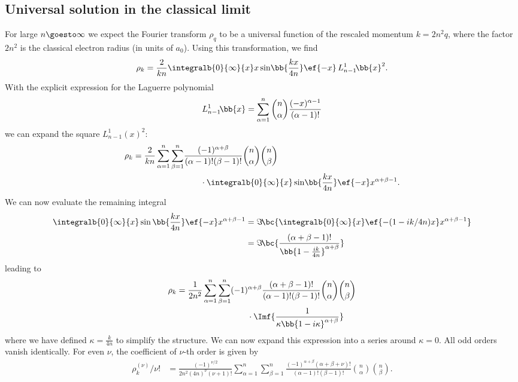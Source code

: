 \subsection{Universal solution in the classical limit}
For large $n \goesto \infty$ we expect the Fourier transform $\rho_q$ to be a universal function of the rescaled momentum $k=2n^2 q$, where the factor $2n^2$ is the classical electron radius (in units of $a_0$). Using this transformation, we find
\begin{align}
\rho_k = \frac{2}{k n}\integralb{0}{\infty}{x} x \sin\!\bb{\frac{kx}{4n}} \ef{-x} \, L_{n-1}^1\!\bb{x}^2.
\end{align}
With the explicit expression for the Laguerre polynomial
\begin{align}
L_{n-1}^1\!\bb{x}=\sum_{\alpha=1}^{n} \binom{n}{\alpha} \frac{(-x)^{\alpha-1}}{(\alpha-1)!}
\end{align}
we can expand the square $L^1_{n-1}(x)^2$:
\begin{align}
    \rho_k=\frac{2}{k n} \sum_{\alpha=1}^{n}\sum_{\beta=1}^{n} &\frac{(-1)^{\alpha+\beta}}{(\alpha-1)! (\beta-1)!} \binom{n}{\alpha}\binom{n}{\beta} \\
&\qquad\cdot \integralb{0}{\infty}{x} \sin\!\bb{\frac{kx}{4n}} \ef{-x} x^{\alpha+\beta-1}.
\end{align}
We can now evaluate the remaining integral
\begin{align}
    \integralb{0}{\infty}{x} \sin\bb{\frac{kx}{4n}} \ef{-x} x^{\alpha+\beta-1} &= \Im\!\bc{ \integralb{0}{\infty}{x} \ef{-(1-ik /4n)x} x^{\alpha+\beta-1}} \\
    &= \Im\!\bc{ \frac{(\alpha+\beta-1)!}{\bb{1-\frac{i k}{4n}}^{\alpha+\beta}} }
\end{align}
leading to
\begin{align}
    \rho_k=\frac{1}{2n^2} \sum_{\alpha=1}^{n}\sum_{\beta=1}^{n} &(-1)^{\alpha+\beta} \frac{(\alpha+\beta-1)!}{(\alpha-1)! (\beta-1)!} \binom{n}{\alpha}\binom{n}{\beta} \\
    &\qquad\cdot \Imf{ \frac{1}{\kappa\bb{ 1-i\kappa }^{\alpha+\beta}} }
\end{align}
where we have defined $\kappa=\frac{k}{4n}$ to simplify the structure.
We can now expand this expression into a series around $\kappa=0$.
All odd orders vanish identically.
For even $\nu$, the coefficient of $\nu$-th order is given by
\begin{align}
\rho^{(\nu)}_k/\nu! &=\frac{(-1)^{\nu/2}}{2n^2 (4n)^\nu (\nu+1)!} \sum_{\alpha=1}^{n}\sum_{\beta=1}^{n}  \frac{(-1)^{\alpha+\beta}(\alpha+\beta+\nu)!}{(\alpha-1)! (\beta-1)!} \binom{n}{\alpha}\binom{n}{\beta}.
\end{align}
